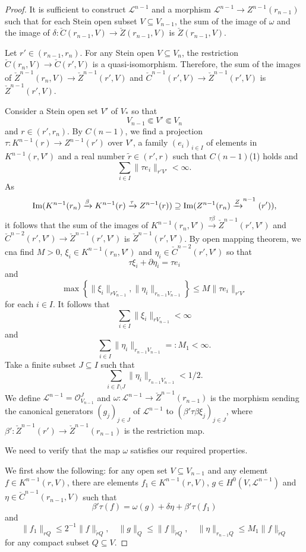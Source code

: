\begin{proof}
It is sufficient to construct $\mathcal{L}^{n-1}$ and a morphism $\mathcal{L}^{n-1}\rightarrow Z^{n-1}(r_{n-1})$ such that for each Stein open subset $V\subseteq V_{n-1}$, the sum of the image of $\omega$ and the image of $\delta:\check{C}(r_{n-1},V)\rightarrow \check{Z}(r_{n-1},V)$ is $\check{Z}(r_{n-1},V)$.

Let $r'\in (r_{n-1},r_n)$. For any Stein open $V\subseteq V_n$, the restriction $\check{C}(r_n,V)\rightarrow \check{C}(r',V)$ is a quasi-isomorphism. Therefore, the sum of the images of $\check{Z}^{n-1}(r_n,V)\rightarrow \check{Z}^{n-1}(r',V)$ and $\check{C}^{n-1}(r',V)\rightarrow \check{Z}^{n-1}(r',V)$ is $\check{Z}^{n-1}(r',V)$.

Consider a Stein open set $V'$ of $V_*$ so that
\[
    V_{n-1}\Subset V'\Subset V_n  
\]
and $r\in (r',r_n)$. By $C(n-1)$, we find a projection $\tau:K^{n-1}(r)\rightarrow Z^{n-1}(r')$ over $V'$, a family $(e_i)_{i\in I}$ of elements in $K^{n-1}(r,V')$ and a real number $\tilde{r}\in (r',r)$ such that $C(n-1)$(1) holds and 
\[
    \sum_{i\in I}\|\tau e_i\|_{r'V'}<\infty.  
\]
As
\[
    \operatorname{Im} (K^{n-1}(r_n)\xrightarrow{\beta}K^{n-1}(r)\xrightarrow{\tau}Z^{n-1}(r))\supseteq \operatorname{Im}(Z^{n-1}(r_n)\xrightarrow Z^{n-1}(r')),    
\]
it follows that the sum of the images of $K^{n-1}(r_n,V')\xrightarrow{\tau\beta} \check{Z}^{n-1}(r',V')$ and $\check{C}^{n-2}(r',V')\rightarrow  \check{Z}^{n-1}(r',V')$ is $ \check{Z}^{n-1}(r',V')$. By open mapping theorem, we cna find $M>0$, $\xi_i\in K^{n-1}(r_n,V')$ and $\eta_i\in \check{C}^{n-2}(r',V')$ so that
\[
    \tau\xi_i+\partial \eta_i=\tau e_i    
\]
and
\[
\max \left\{\|\xi_i\|_{rV_{n-1}},\|\eta_i\|_{r_{n-1}V_{n-1}}\right\}\leq M\|\tau e_i\|_{r'V'}
\]
for each $i\in I$. It follows that 
\[
    \sum_{i\in I} \|\xi_i\|_{rV_{n-1}}<\infty  
\]
and
\[
    \sum_{i\in I}\|\eta_i\|_{r_{n-1}V_{n-1}}=:M_1<\infty.  
\]
Take a finite subset $J\subseteq I$ such that 
\[
    \sum_{i\in I\setminus J}  \|\eta_i\|_{r_{n-1}V_{n-1}}<1/2.
\]
We define $\mathcal{L}^{n-1}=\mathcal{O}_{V_{n-1}}^J$ and $\omega:\mathcal{L}^{n-1}\rightarrow \check{Z}^{n-1}(r_{n-1})$ is the morphism sending the canonical generators $(g_j)_{j\in J}$ of $\mathcal{L}^{n-1}$ to $(\beta' \tau\beta\xi_j)_{j\in J}$, where $\beta':\check{Z}^{n-1}(r')\rightarrow \check{Z}^{n-1}(r_{n-1})$ is the restriction map.

We need to verify that the map $\omega$ satisfies our required properties.

We first show the following: for any open set $V\subseteq V_{n-1}$ and any element $f\in K^{n-1}(r,V)$, there are elements $f_1\in K^{n-1}(r,V)$, $g\in H^0(V,\mathcal{L}^{n-1})$ and $\eta\in \check{C}^{n-1}(r_{n-1},V)$ such that 
\[
    \beta'\tau(f)=\omega(g)+\delta\eta+\beta'\tau(f_1)
\]
and
\[
    \|f_1\|_{rQ}\leq 2^{-1}\|f\|_{\tilde{r}Q},\quad \|g\|_{Q}\leq \|f\|_{\tilde{r}Q} ,\quad \|\eta\|_{r_{n-1}Q}\leq M_1\|f\|_{\tilde{r}Q} 
\]
for any compact subset $Q\subseteq V$.


\end{proof}

